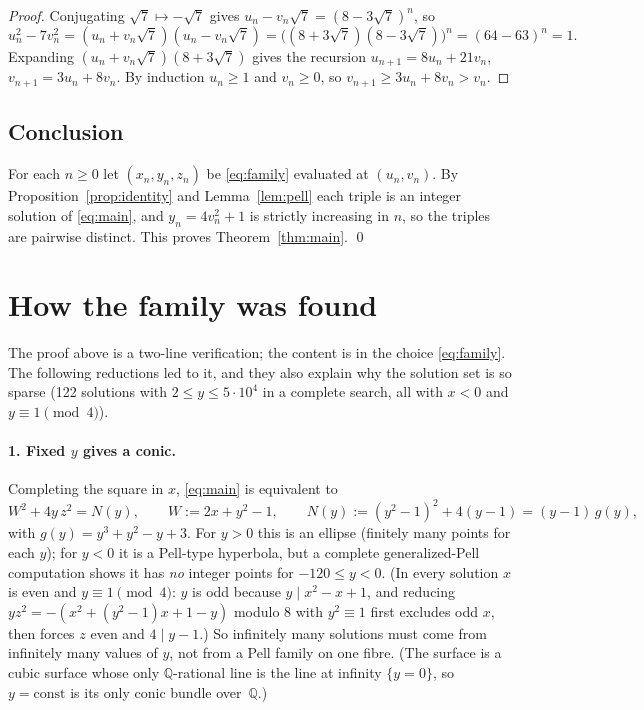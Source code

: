 \documentclass[11pt]{article}
\theoremstyle{remark}
\begin{document}
\begin{proof}
Conjugating $\sqrt7\mapsto-\sqrt7$ gives $u_n-v_n\sqrt7=(8-3\sqrt7)^{n}$, so
\[
u_n^{2}-7v_n^{2}=(u_n+v_n\sqrt7)(u_n-v_n\sqrt7)=\bigl((8+3\sqrt7)(8-3\sqrt7)\bigr)^{n}=(64-63)^{n}=1 .
\]
Expanding $(u_n+v_n\sqrt7)(8+3\sqrt7)$ gives the recursion
$u_{n+1}=8u_n+21v_n$, $v_{n+1}=3u_n+8v_n$. By induction $u_n\ge 1$ and $v_n\ge 0$,
so $v_{n+1}\ge 3u_n+8v_n>v_n$.
\end{proof}

\subsection{Conclusion}

For each $n\ge0$ let $(x_n,y_n,z_n)$ be \eqref{eq:family} evaluated at $(u_n,v_n)$.
By Proposition~\ref{prop:identity} and Lemma~\ref{lem:pell} each triple is an integer
solution of \eqref{eq:main}, and $y_n=4v_n^{2}+1$ is strictly increasing in $n$, so the
triples are pairwise distinct. This proves Theorem~\ref{thm:main}. \qed

\section{How the family was found}

The proof above is a two-line verification; the content is in the choice
\eqref{eq:family}. The following reductions led to it, and they also explain why the
solution set is so sparse (122 solutions with $2\le y\le 5\cdot10^{4}$ in a complete
search, all with $x<0$ and $y\equiv1\pmod 4$).

\paragraph{1. Fixed $y$ gives a conic.} Completing the square in $x$,
\eqref{eq:main} is equivalent to
\begin{equation}\label{eq:conic}
W^{2}+4y\,z^{2}=N(y),\qquad W:=2x+y^{2}-1,\qquad N(y):=(y^{2}-1)^{2}+4(y-1)=(y-1)\,g(y),
\end{equation}
with $g(y)=y^{3}+y^{2}-y+3$. For $y>0$ this is an ellipse (finitely many points for each
$y$); for $y<0$ it is a Pell-type hyperbola, but a complete generalized-Pell computation
shows it has \emph{no} integer points for $-120\le y<0$. (In every solution $x$ is even
and $y\equiv1\pmod 4$: $y$ is odd because $y\mid x^{2}-x+1$, and reducing
$yz^{2}=-(x^{2}+(y^{2}-1)x+1-y)$ modulo $8$ with $y^{2}\equiv1$ first excludes odd $x$,
then forces $z$ even and $4\mid y-1$.) So infinitely many
solutions must come from infinitely many values of $y$, not from a Pell family on one
fibre. (The surface is a cubic surface whose only $\mathbb{Q}$-rational line is the line
at infinity $\{y=0\}$, so $y=\mathrm{const}$ is its only conic bundle over~$\mathbb{Q}$.)
\end{document}
